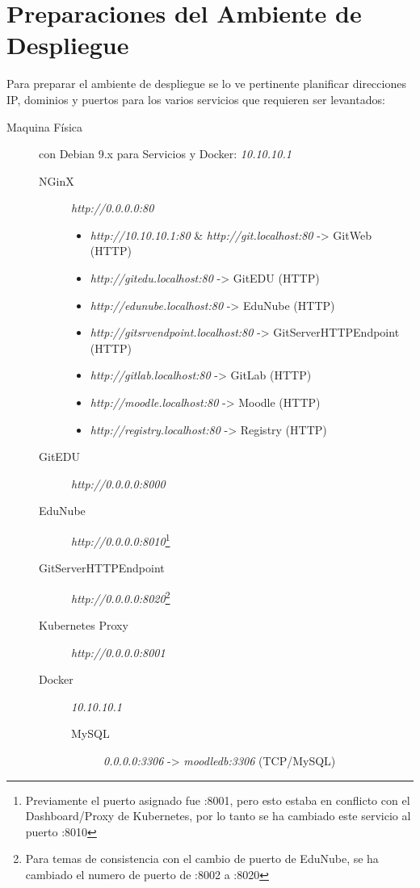 \section{Preparaciones del Ambiente de Despliegue}
Para preparar el ambiente de despliegue se lo ve pertinente planificar direcciones IP, dominios y puertos para los varios servicios que requieren ser levantados:
\begin{description}
	\item[Maquina Física] con Debian 9.x para Servicios y Docker: \textit{10.10.10.1}
    \begin{description}
    	\item[NGinX] \textit{http://0.0.0.0:80} 
        \begin{itemize}
            \item \textit{http://10.10.10.1:80} \& \textit{http://git.localhost:80} -> GitWeb (HTTP)
            \item \textit{http://gitedu.localhost:80} -> GitEDU (HTTP)
            \item \textit{http://edunube.localhost:80} -> EduNube (HTTP)
            \item \textit{http://gitsrvendpoint.localhost:80} -> GitServerHTTPEndpoint (HTTP)
            \item \textit{http://gitlab.localhost:80} -> GitLab (HTTP)
            \item \textit{http://moodle.localhost:80} -> Moodle (HTTP)
            \item \textit{http://registry.localhost:80} -> Registry (HTTP)
        \end{itemize}
        \item[GitEDU] \textit{http://0.0.0.0:8000}
        \item[EduNube] \textit{http://0.0.0.0:8010}\footnote{Previamente el puerto asignado fue :8001, pero esto estaba en conflicto con el Dashboard/Proxy de Kubernetes, por lo tanto se ha cambiado este servicio al puerto :8010}
        \item[GitServerHTTPEndpoint] \textit{http://0.0.0.0:8020}\footnote{Para temas de consistencia con el cambio de puerto de EduNube, se ha cambiado el numero de puerto de :8002 a :8020}
        \item[Kubernetes Proxy] \textit{http://0.0.0.0:8001}
        \item[Docker] \textit{10.10.10.1}
        \begin{description}
        	\item[MySQL] \textit{0.0.0.0:3306} -> \textit{moodledb:3306} (TCP/MySQL)

\end{description}
\end{description}
\end{description}
